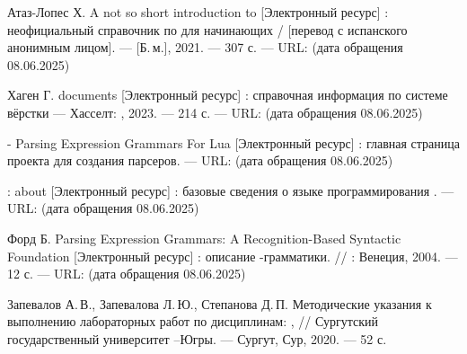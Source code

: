 \stoptitle

\stopsectionblock

\startsectionblock[main]

\starttitle[
    title={Основная часть},
    reference={title: main},
]



\stoptitle

\stopsectionblock

\startsectionblock[conclude]

\starttitle[
    title={Заключение},
    reference={title: conclude},
]



\stoptitle

\stopsectionblock

\startsectionblock[sources]

\starttitle[
    title={Список использованных источников},
    reference={title: sources},
]

\startitemize[n]

Атаз-Лопес Х. A not so short introduction to  [Электронный ресурс] : неофициальный справочник по  для начинающих / [перевод с испанского анонимным лицом]. --- [Б.\,м.], 2021. --- 307 с. --- URL: \from[introCTX] (дата обращения 08.06.2025)
\stopitem

Хаген Г.   documents [Электронный ресурс] : справочная информация по системе вёрстки  --- Хасселт: , 2023. --- 214 с. --- URL:  (дата обращения 08.06.2025)
\stopitem

 - Parsing Expression Grammars For Lua [Электронный ресурс] : главная страница проекта  для создания парсеров. --- URL: \from[lpeg] (дата обращения 08.06.2025)
\stopitem

: about [Электронный ресурс] : базовые сведения о языке программирования . --- URL:  (дата обращения 08.06.2025)
\stopitem

Форд Б. Parsing Expression Grammars: A Recognition-Based Syntactic Foundation [Электронный ресурс] : описание -грамматики. // : Венеция, 2004. --- 12 с. --- URL: \from[peg] (дата обращения 08.06.2025)
\stopitem

Запевалов А.\,В., Запевалова Л.\,Ю., Степанова Д.\,П. Методические указания к выполнению лабораторных работ по дисциплинам: ,  // Сургутский государственный университет --Югры. --- Сургут,  Сур, 2020. --- 52 с.
\stopitem

